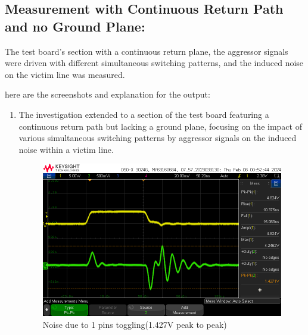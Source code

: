 \documentclass[a4paper,11pt]{article}%
\begin{document}
\subsection{Measurement with Continuous Return Path and no Ground Plane:}
The test board's section with a continuous return plane, the aggressor signals were driven with different simultaneous switching patterns, and the induced noise on the victim line was measured.


here are the screenshots and explanation for the output:

\begin{enumerate}
	\item The investigation extended to a section of the test board featuring a continuous return path but lacking a ground plane, focusing on the impact of various simultaneous switching patterns by aggressor signals on the induced noise within a victim line.
	\begin{figure}[H]
		\centering
		\includegraphics[scale=0.5]{figures/noise_np__cr1.png}
		\caption{Noise due to 1 pins toggling(1.427V peak to peak)}
		\label{noise_np__cr1}
	\end{figure}


\end{enumerate}
\end{document}
